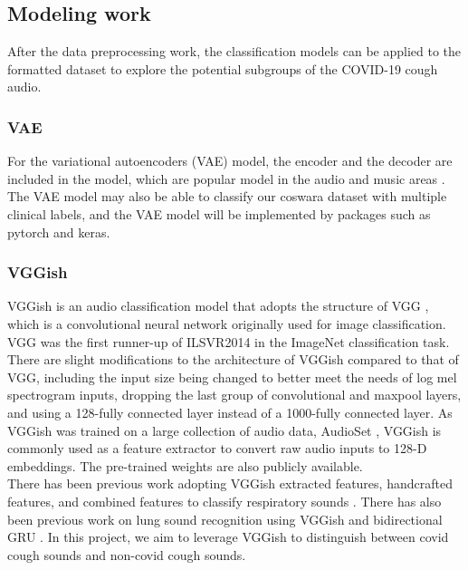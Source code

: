 \documentclass[11pt]{article}
\begin{document}
\subsection{Modeling work}
After the data preprocessing work, the classification models can be applied to the formatted 
dataset to explore the potential subgroups of the COVID-19 cough audio.

\subsubsection{VAE}
For the variational autoencoders (VAE) model,
the encoder and the decoder are included in the model, which are popular model in the audio and
music areas \cite{girin2020dynamical}. The VAE model may also be able to classify our coswara dataset with multiple
clinical labels, and the VAE model will be implemented by packages such as pytorch and keras.

\subsubsection{VGGish}
VGGish \cite{Chao1st} is an audio classification model that adopts the structure of VGG \cite{Chao2nd}, which is a
convolutional neural network originally used for image classification. VGG was the first runner-up of
ILSVR2014 in the ImageNet classification task. There are slight modifications to the architecture of
VGGish compared to that of VGG, including the input size being changed to better meet the needs of
log mel spectrogram inputs, dropping the last group of convolutional and maxpool layers, and using
a 128-fully connected layer instead of a 1000-fully connected layer. As VGGish was trained on a large
collection of audio data, AudioSet \cite{Chao3rd}, VGGish is commonly used as a feature extractor to convert
raw audio inputs to 128-D embeddings. The pre-trained weights are also publicly available. \\

\noindent
There has been previous work adopting VGGish extracted features, handcrafted features, and combined
 features to classify respiratory sounds \cite{Chao1st}. There has also been previous work on lung sound
 recognition using VGGish and bidirectional GRU \cite{Chao5th}. In this project, we aim to leverage VGGish to
 distinguish between covid cough sounds and non-covid cough sounds.
\end{document}
